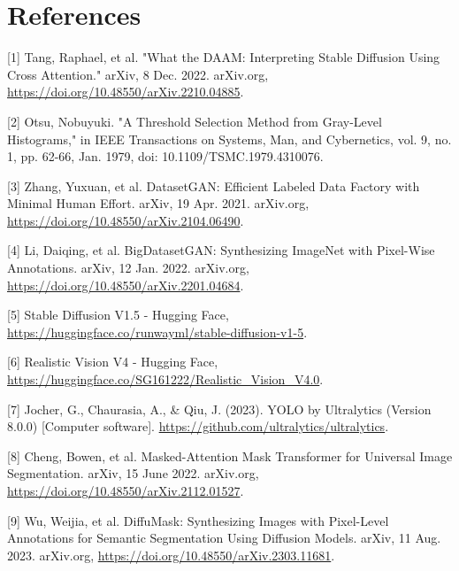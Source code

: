 \documentclass{article}
\begin{document}
\section*{References}
{
\small
[1] Tang, Raphael, et al. "What the DAAM: Interpreting Stable Diffusion Using Cross Attention." arXiv, 8 Dec. 2022. arXiv.org, \url{https://doi.org/10.48550/arXiv.2210.04885}.

[2] Otsu, Nobuyuki. "A Threshold Selection Method from Gray-Level Histograms," in IEEE Transactions on Systems, Man, and Cybernetics, vol. 9, no. 1, pp. 62-66, Jan. 1979, doi: 10.1109/TSMC.1979.4310076.

[3] Zhang, Yuxuan, et al. DatasetGAN: Efficient Labeled Data Factory with Minimal Human Effort. arXiv, 19 Apr. 2021. arXiv.org, \url{https://doi.org/10.48550/arXiv.2104.06490}.

[4] Li, Daiqing, et al. BigDatasetGAN: Synthesizing ImageNet with Pixel-Wise Annotations. arXiv, 12 Jan. 2022. arXiv.org, \url{https://doi.org/10.48550/arXiv.2201.04684}.

[5] Stable Diffusion V1.5 - Hugging Face, 
\url{https://huggingface.co/runwayml/stable-diffusion-v1-5}.

[6] Realistic Vision V4 - Hugging Face,  \url{https://huggingface.co/SG161222/Realistic_Vision_V4.0}.

[7] Jocher, G., Chaurasia, A., \& Qiu, J. (2023). YOLO by Ultralytics (Version 8.0.0) [Computer software]. \url{https://github.com/ultralytics/ultralytics}.

[8] Cheng, Bowen, et al. Masked-Attention Mask Transformer for Universal Image Segmentation. arXiv, 15 June 2022. arXiv.org, \url{https://doi.org/10.48550/arXiv.2112.01527}.

[9] Wu, Weijia, et al. DiffuMask: Synthesizing Images with Pixel-Level Annotations for Semantic Segmentation Using Diffusion Models. arXiv, 11 Aug. 2023. arXiv.org, \url{https://doi.org/10.48550/arXiv.2303.11681}.
}
\end{document}
